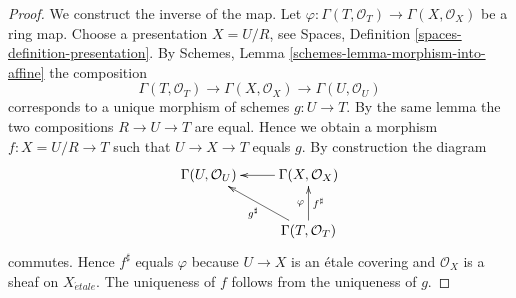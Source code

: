 \documentclass[10pt,a4paper]{amsart}
\theoremstyle{plain}
\theoremstyle{definition}
\theoremstyle{remark}
\numberwithin{equation}{subsection}
\def\etale{{\acute{e}tale}}
\begin{document}
\begin{proof}
We construct the inverse of the map.
Let $\varphi : \Gamma(T, \mathcal{O}_T) \to \Gamma(X, \mathcal{O}_X)$
be a ring map. Choose a presentation $X = U/R$, see
Spaces, Definition \ref{spaces-definition-presentation}.
By
Schemes, Lemma \ref{schemes-lemma-morphism-into-affine}
the composition
$$
\Gamma(T, \mathcal{O}_T) \to \Gamma(X, \mathcal{O}_X) \to
\Gamma(U, \mathcal{O}_U)
$$
corresponds to a unique morphism of schemes $g : U \to T$. By the same lemma
the two compositions $R \to U \to T$ are equal. Hence we obtain a morphism
$f : X = U/R \to T$ such that $U \to X \to T$ equals $g$. By construction
the diagram
$$
\xymatrix{
\Gamma(U, \mathcal{O}_U) & \Gamma(X, \mathcal{O}_X) \ar[l] \\
& \Gamma(T, \mathcal{O}_T) \ar[lu]^{g^\sharp} \ar[u]^{\varphi}_{f^\sharp}
}
$$
commutes. Hence $f^\sharp$ equals $\varphi$ because $U \to X$ is an
\'etale covering and $\mathcal{O}_X$ is a sheaf on $X_\etale$.
The uniqueness of $f$ follows from the uniqueness of $g$.
\end{proof}
\end{document}
